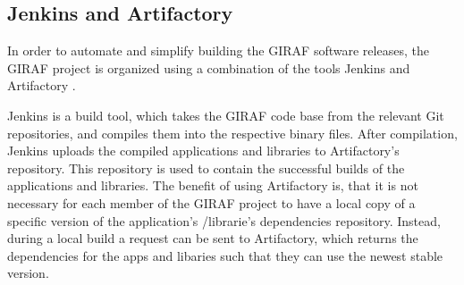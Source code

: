 \subsection{Jenkins and Artifactory}
In order to automate and simplify building the GIRAF software releases, the
GIRAF project is organized using a combination of the tools Jenkins
\citep{Jenkins} and Artifactory \citep{Arti}.\nl

Jenkins is a build tool, which takes the GIRAF code base from the relevant Git
repositories, and compiles them into the respective binary files. After
compilation, Jenkins uploads the compiled applications and libraries to
Artifactory's repository. This repository is used to contain the
successful builds of the applications and libraries. The benefit of using
Artifactory is, that it is not necessary for each member of the GIRAF project
to have a local copy of a specific version of the application's /librarie's
dependencies repository. Instead, during a local build a request can be sent to
Artifactory, which returns the dependencies for the apps and libaries such that
they can use the newest stable version.

